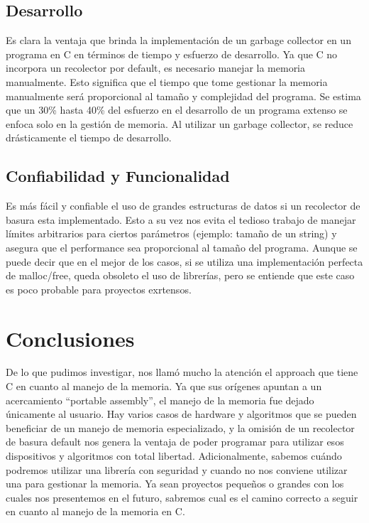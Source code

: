 \documentclass[11pt]{article} %
\begin{document}
\subsection{Desarrollo}
	Es clara la ventaja que brinda la implementación de un garbage collector en un programa en C en términos de tiempo y esfuerzo de desarrollo. Ya que C no incorpora un recolector por default, es necesario manejar la memoria manualmente. Esto significa que el tiempo que tome gestionar la memoria manualmente será proporcional al tamaño y complejidad del programa. Se estima que un 30\% hasta 40\% del esfuerzo en el desarrollo de un programa extenso se enfoca solo en la gestión de memoria. Al utilizar un garbage collector, se reduce drásticamente el tiempo de desarrollo.
\subsection{Confiabilidad y Funcionalidad}
	Es más fácil y confiable el uso de grandes estructuras de datos si un recolector de basura esta implementado. Esto a su vez nos evita el tedioso trabajo de manejar límites arbitrarios para ciertos parámetros (ejemplo: tamaño de un string) y asegura que el performance sea proporcional al tamaño del programa. Aunque se puede decir que en el mejor de los casos, si se utiliza una implementación perfecta de malloc/free, queda obsoleto el uso de librerías, pero se entiende que este caso es poco probable para proyectos exrtensos.

\section{Conclusiones}
	De lo que pudimos investigar, nos llamó mucho la atención el approach que tiene C en cuanto al manejo de la memoria. Ya que sus orígenes apuntan a un acercamiento “portable assembly”, el manejo de la memoria fue dejado únicamente al usuario. Hay varios casos de hardware y algoritmos que se pueden beneficiar de un manejo de memoria especializado, y la omisión de un recolector de basura default nos genera la ventaja de poder programar para utilizar esos dispositivos y algoritmos con total libertad.
	Adicionalmente, sabemos cuándo podremos utilizar una librería con seguridad y cuando no nos conviene utilizar una para gestionar la memoria. Ya sean proyectos pequeños o grandes con los cuales nos presentemos en el futuro, sabremos cual es el camino correcto a seguir en cuanto al manejo de la memoria en C.
\end{document}
